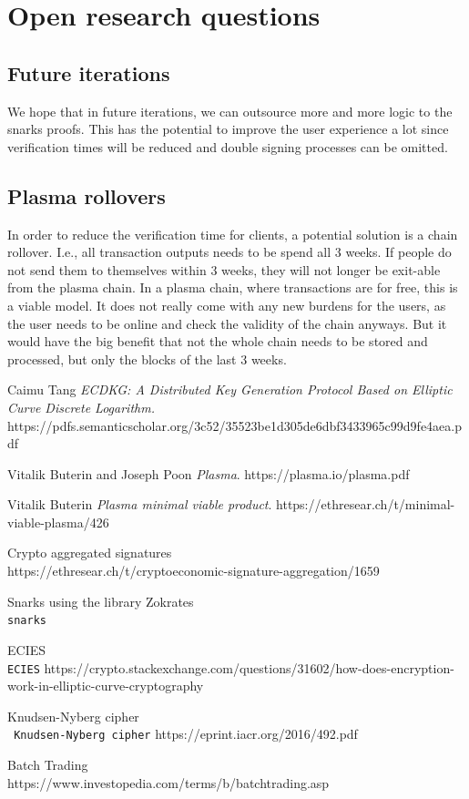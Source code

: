 \documentclass[11pt,parskip=full]{scrartcl}%
\begin{document}
\section{Open research questions}

\subsection{Future iterations}
We hope that in future iterations, we can outsource more and more logic to the snarks proofs. This has the potential to improve the user experience a lot since verification times will be reduced and double signing processes can be omitted.

\subsection{Plasma rollovers}
In order to reduce the verification time for clients, a potential solution is a chain rollover. I.e., all transaction outputs needs to be spend all 3 weeks. If people do not send them to themselves within 3 weeks, they will not longer be exit-able from the plasma chain. In a plasma chain, where transactions are for free, this is a viable model. It does not really come with any new burdens for the users, as the user needs to be online and check the validity of the chain anyways.\newline
But it would have the big benefit that not the whole chain needs to be stored and processed, but only the blocks of the last 3 weeks.



\begin{thebibliography}{9}
Caimu Tang
\textit{ECDKG: A Distributed Key Generation Protocol Based on Elliptic
Curve Discrete Logarithm.}  
https://pdfs.semanticscholar.org/3c52/35523be1d305de6dbf3433965c99d9fe4aea.pdf
 
Vitalik Buterin and Joseph Poon
\textit{Plasma}. 
https://plasma.io/plasma.pdf

Vitalik Buterin
\textit{Plasma minimal viable product}. 
https://ethresear.ch/t/minimal-viable-plasma/426
 
Crypto aggregated signatures
\\\texttt{}
https://ethresear.ch/t/cryptoeconomic-signature-aggregation/1659

Snarks using the library Zokrates
\\\texttt{snarks}

ECIES
\\\texttt{ECIES}
https://crypto.stackexchange.com/questions/31602/how-does-encryption-work-in-elliptic-curve-cryptography

Knudsen-Nyberg cipher
\\\texttt{ Knudsen-Nyberg cipher}
https://eprint.iacr.org/2016/492.pdf


Batch Trading
\\\texttt{}
https://www.investopedia.com/terms/b/batchtrading.asp

\end{thebibliography}
\end{document}

